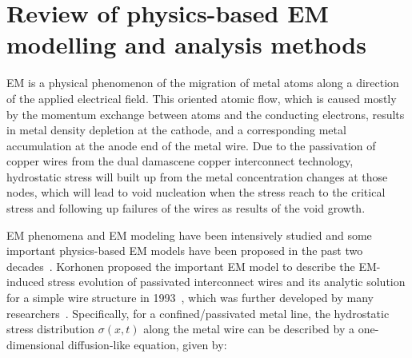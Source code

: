 \section{Review of physics-based EM modelling and analysis methods}
\label{sec:reliability_modeling}

EM is a physical phenomenon of the migration of metal atoms along a
direction of the applied electrical field. This oriented atomic flow,
which is caused mostly by the momentum exchange between atoms and the
conducting electrons, results in metal density depletion at the
cathode, and a corresponding metal accumulation at the anode end of
the metal wire. Due to the passivation of copper wires from the dual
damascene copper interconnect technology, hydrostatic stress will
built up from the metal concentration changes at those nodes, which
will lead to void nucleation when the stress reach to the critical
stress and following up failures of the wires as results of the void
growth.

EM phenomena and EM modeling have been intensively studied and some
important physics-based EM models have been proposed in the past two
decades~\cite{deOrio:2010}. Korhonen proposed the important EM model
to describe the EM-induced stress evolution of passivated interconnect
wires and its analytic solution for a simple wire structure in
1993~\cite{Korhonen:jap1993}, which was further developed by many
researchers~\cite{Clement:1999tcad, Sukharev:2015jap}. Specifically,
for a confined/passivated metal line, the hydrostatic stress
distribution $\sigma(x,t)$ along the metal wire can be described by a
one-dimensional diffusion-like equation, given
by:~\cite{Korhonen:jap1993}
%


